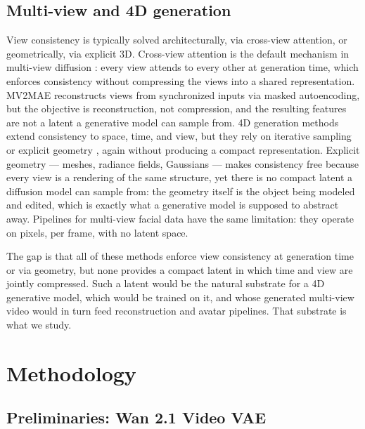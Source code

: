 \subsection{Multi-view and 4D generation}

View consistency is typically solved architecturally, via cross-view attention, or geometrically, via explicit 3D. Cross-view attention is the default mechanism in multi-view diffusion \cite{shi2023mvdream, gao2024cat3d, voleti2024sv3d, zuo2024videomv}: every view attends to every other at generation time, which enforces consistency without compressing the views into a shared representation. MV2MAE \cite{shah2024mv2mae} reconstructs views from synchronized inputs via masked autoencoding, but the objective is reconstruction, not compression, and the resulting features are not a latent a generative model can sample from. 4D generation methods extend consistency to space, time, and view, but they rely on iterative sampling or explicit geometry \cite{zhang20244diffusion, xie2024sv4d, shao2024human4dit, jiang2026mesh4d}, again without producing a compact representation. Explicit geometry --- meshes, radiance fields, Gaussians \cite{qian2024gaussianavatars, kirschstein2023nersemble} --- makes consistency free because every view is a rendering of the same structure, yet there is no compact latent a diffusion model can sample from: the geometry itself is the object being modeled and edited, which is exactly what a generative model is supposed to abstract away. Pipelines for multi-view facial data \cite{lombardi2018deep, lombardi2021mixture} have the same limitation: they operate on pixels, per frame, with no latent space.

The gap is that all of these methods enforce view consistency at generation time or via geometry, but none provides a compact latent in which time and view are jointly compressed. Such a latent would be the natural substrate for a 4D generative model, which would be trained on it, and whose generated multi-view video would in turn feed reconstruction and avatar pipelines. That substrate is what we study.

\section{Methodology}

\subsection{Preliminaries: Wan 2.1 Video VAE}
\label{sec:preliminaries}

